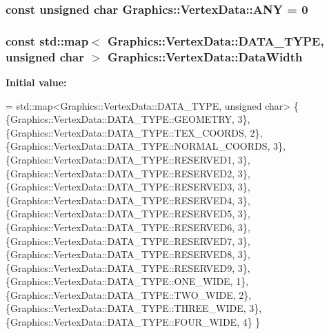 \subsubsection[{A\+N\+Y}]{\setlength{\rightskip}{0pt plus 5cm}const unsigned char Graphics\+::\+Vertex\+Data\+::\+A\+N\+Y = 0\hspace{0.3cm}{\ttfamily [private]}}\label{class_graphics_1_1_vertex_data_a0fc546e15f8fc02868e94246b93dd1b5}
\hypertarget{class_graphics_1_1_vertex_data_a8b7b2345af2cce65482bf48c503f15f6}{}
\subsubsection[{Data\+Width}]{\setlength{\rightskip}{0pt plus 5cm}const std\+::map$<$ {\bf Graphics\+::\+Vertex\+Data\+::\+D\+A\+T\+A\+\_\+\+T\+Y\+P\+E}, unsigned char $>$ Graphics\+::\+Vertex\+Data\+::\+Data\+Width\hspace{0.3cm}{\ttfamily [static]}}\label{class_graphics_1_1_vertex_data_a8b7b2345af2cce65482bf48c503f15f6}
{\bfseries Initial value\+:}
\begin{DoxyCode}
= std::map<Graphics::VertexData::DATA\_TYPE, unsigned char>  \{
        \{Graphics::VertexData::DATA\_TYPE::GEOMETRY, 3\},
        \{Graphics::VertexData::DATA\_TYPE::TEX\_COORDS, 2\},
        \{Graphics::VertexData::DATA\_TYPE::NORMAL\_COORDS, 3\},
        \{Graphics::VertexData::DATA\_TYPE::RESERVED1, 3\},
        \{Graphics::VertexData::DATA\_TYPE::RESERVED2, 3\},
        \{Graphics::VertexData::DATA\_TYPE::RESERVED3, 3\},
        \{Graphics::VertexData::DATA\_TYPE::RESERVED4, 3\},
        \{Graphics::VertexData::DATA\_TYPE::RESERVED5, 3\},
        \{Graphics::VertexData::DATA\_TYPE::RESERVED6, 3\},
        \{Graphics::VertexData::DATA\_TYPE::RESERVED7, 3\},
        \{Graphics::VertexData::DATA\_TYPE::RESERVED8, 3\},
        \{Graphics::VertexData::DATA\_TYPE::RESERVED9, 3\},
        \{Graphics::VertexData::DATA\_TYPE::ONE\_WIDE, 1\},
        \{Graphics::VertexData::DATA\_TYPE::TWO\_WIDE, 2\},
        \{Graphics::VertexData::DATA\_TYPE::THREE\_WIDE, 3\},
        \{Graphics::VertexData::DATA\_TYPE::FOUR\_WIDE, 4\}
  \}
\end{DoxyCode}
\hypertarget{class_graphics_1_1_vertex_data_a4a88da3318b4c8deff9fa6168e75dd0a}{}

